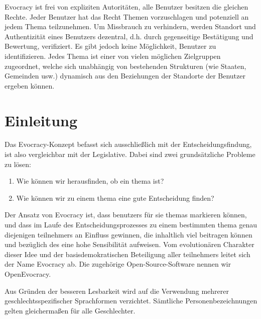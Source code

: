 \documentclass[10pt]{article}
\begin{document}
Evocracy ist frei von expliziten Autoritäten, alle Benutzer besitzen die gleichen Rechte. Jeder Benutzer hat das Recht Themen vorzuschlagen und potenziell an jedem Thema teilzunehmen. Um Missbrauch zu verhindern, werden Standort und Authentizität eines Benutzers dezentral, d.h. durch gegenseitige Bestätigung und Bewertung, verifiziert. Es gibt jedoch keine Möglichkeit, Benutzer zu identifizieren. Jedes Thema ist einer von vielen möglichen Zielgruppen zugeordnet, welche sich unabhängig von bestehenden Strukturen (wie Staaten, Gemeinden usw.) dynamisch aus den Beziehungen der Standorte der Benutzer ergeben können.
\newpage

\tableofcontents
\newpage


\section{Einleitung}

Das Evocracy-Konzept befasst sich ausschließlich mit der Entscheidungsfindung, ist also vergleichbar mit der Legislative. Dabei sind zwei grundsätzliche Probleme zu lösen:

\begin{enumerate}
    \item Wie können wir herausfinden, ob ein \gls{thema}  ist?
    \item Wie können wir zu einem \gls{thema} eine gute Entscheidung finden? 
\end{enumerate}

Der Ansatz von Evocracy ist, dass \glspl{benutzer} für sie  \glspl{thema} markieren können, und dass im Laufe des Entscheidungsprozesses zu einem bestimmten \gls{thema} genau diejenigen \glspl{teilnehmer} an Einfluss gewinnen, die inhaltlich viel beitragen können und bezüglich des  eine hohe Sensibilität aufweisen. Vom evolutionären Charakter dieser Idee und der basisdemokratischen Beteiligung aller \glspl{teilnehmer} leitet sich der Name Evocracy ab. Die zugehörige Open-Source-Software nennen wir OpenEvocracy.

Aus Gründen der besseren Lesbarkeit wird auf die Verwendung mehrerer geschlechtsspezifischer Sprachformen verzichtet. Sämtliche Personenbezeichnungen gelten gleichermaßen für alle Geschlechter.

\end{document}
